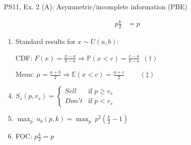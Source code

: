 \begin{frame}{PS11, Ex. 2 (A): Asymmetric/incomplete information (PBE)}
\begin{multicols}{2}
\begin{align*}
        p\frac{k}{2}&=p
      \end{align*}
      \vfill\null\columnbreak
      \begin{enumerate}
        \item Standard results for $x\sim U(a, b):$
        \item[CDF:] $F(x)=\frac{x-a}{b-a}\Rightarrow\mathbb{P}(x<c)=\frac{c-a}{b-a}\ \ (\dagger)$
        \item[Mean:] $\mu=\frac{a+b}{2}\Rightarrow\mathbb{E}(x<c)=\frac{a+c}{2}\quad\quad\ (\ddagger)$
        \item $S_s(p,v_s)=\left\{\begin{array}{ll}
          Sell  & \text{if }p\geq v_s \\
          Don't & \text{if }p < v_s
        \end{array}\right.$
        \item $\displaystyle{\max_p}\ u_b(p,k)=\displaystyle{\max_p}\ p^2\left(\frac{k}{2}-1\right)$
        \item FOC: $p\frac{k}{2}=p$
      \end{enumerate}
      \vfill\null
    \end{multicols}
\end{frame}
